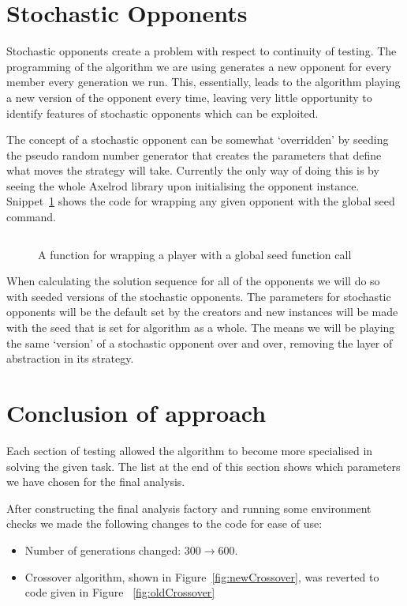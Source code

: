 \section{Stochastic Opponents}\label{sec:stochasticOpponents}
Stochastic opponents create a problem with respect to continuity of testing.
The programming of the algorithm we are using generates a new opponent for every member every generation we run.
This, essentially, leads to the algorithm playing a new version of the opponent every time, leaving very little opportunity to identify features of stochastic opponents which can be exploited.

The concept of a stochastic opponent can be somewhat `overridden' by seeding the pseudo random number generator that creates the parameters that define what moves the strategy will take.
Currently the only way of doing this is by seeing the whole Axelrod library upon initialising the opponent instance.
Snippet~\ref{code:wrappingFunction} shows the code for wrapping any given opponent with the global seed command.

\begin{figure}
    \inputminted{python}{code_snippets/classWrappingFunction.py}
    \caption{A function for wrapping a player with a global seed function call}\label{code:wrappingFunction}
\end{figure}

When calculating the solution sequence for all of the opponents we will do so with seeded versions of the stochastic opponents.
The parameters for stochastic opponents will be the default set by the creators and new instances will be made with the seed that is set for algorithm as a whole.
The means we will be playing the same `version' of a stochastic opponent over and over, removing the layer of abstraction in its strategy.

\section{Conclusion of approach}\label{sec:conclusionOfApproach}
Each section of testing allowed the algorithm to become more specialised in solving the given task.
The list at the end of this section shows which parameters we have chosen for the final analysis.

After constructing the final analysis factory and running some environment checks we made the following changes to the code for ease of use:
\begin{itemize}
    \item Number of generations changed: $300\rightarrow600$.
    \item Crossover algorithm, shown in Figure~\ref{fig:newCrossover}, was reverted to code given in Figure ~\ref{fig:oldCrossover}
\end{itemize}

